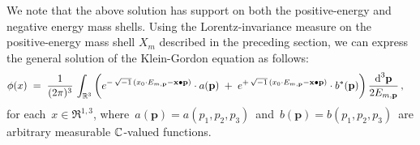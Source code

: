 We note that the above solution has support on both the positive-energy and negative energy mass shells.
Using the Lorentz-invariance measure on the positive-energy mass shell $X_{m}$ described in the preceding section,
we can express the general solution of the Klein-Gordon equation as follows:
\begin{equation*}
\phi(x)
\; = \;
	\dfrac{1}{(2\pi)^{3}}\,
	\int_{\Re^{3}} \left(
		e^{-\,\overset{{\color{white}.}}{\sqrt{-1}}\,
			(x_{0} \cdot E_{m,\mathbf{p}} - \mathbf{x} \bullet \mathbf{p})
			}
		\cdot
		a(\mathbf{p})
		\; + \;
		e^{+\,\overset{{\color{white}.}}{\sqrt{-1}}\,
			(x_{0} \cdot E_{m,\mathbf{p}} - \mathbf{x} \bullet \mathbf{p})
			}
		\cdot
		b^{*}(\mathbf{p})
		\right)
		\dfrac{\d^{3}\mathbf{p}}{2 E_{m,\mathbf{p}}}\,,
\quad
\end{equation*}
for each \,$x \in \Re^{1,3}$,
where
\,$a(\mathbf{p}) = a(p_{1},p_{2},p_{3})$\,
and
\,$b(\mathbf{p}) = b(p_{1},p_{2},p_{3})$\,
are arbitrary measurable $\mathbb{C}$-valued functions.

